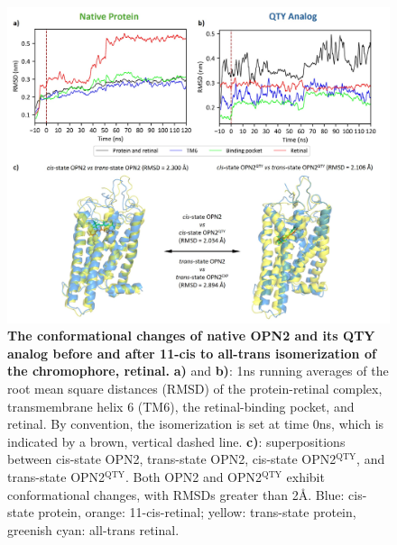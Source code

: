\documentclass[fleqn, 10pt]{manuscript}
\begin{document}
\begin{figure}[htbp]
	\centering
	\includegraphics[width=\linewidth]{Figures/function-conformation.jpg}
	\caption{\textbf{The conformational changes of native OPN2 and its QTY analog before and after 11-cis to all-trans isomerization of the chromophore, retinal. } \textbf{a)} and \textbf{b)}: 1ns running averages of the root mean square distances (RMSD) of the protein-retinal complex, transmembrane helix 6 (TM6), the retinal-binding pocket, and retinal. By convention, the isomerization is set at time 0ns, which is indicated by a brown, vertical dashed line. \textbf{c)}: superpositions between cis-state OPN2, trans-state OPN2, cis-state OPN2$^{\textrm{QTY}}$, and trans-state OPN2$^{\textrm{QTY}}$. Both OPN2 and OPN2$^{\textrm{QTY}}$ exhibit conformational changes, with RMSDs greater than 2\AA. Blue: cis-state protein, orange: 11-cis-retinal; yellow: trans-state protein, greenish cyan: all-trans retinal. }
	\label{fig:conformation}
\end{figure}
\end{document}

